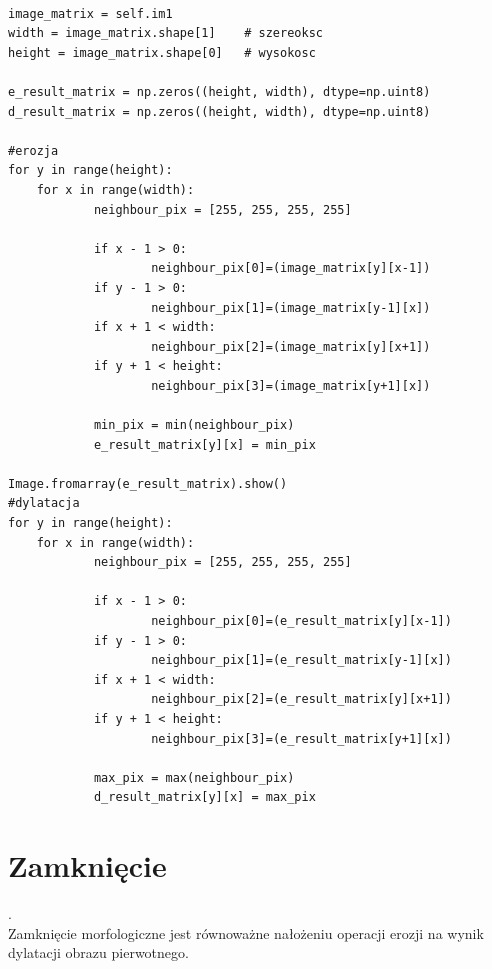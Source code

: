 \documentclass[final,a4paper,openany,12pt]{mwbk}
\begin{document}
\begin{lstlisting}[caption= Operacja otwarcia na obrazie szarym]

image_matrix = self.im1
width = image_matrix.shape[1]    # szereoksc
height = image_matrix.shape[0]   # wysokosc

e_result_matrix = np.zeros((height, width), dtype=np.uint8)
d_result_matrix = np.zeros((height, width), dtype=np.uint8)

#erozja
for y in range(height):
    for x in range(width):  
            neighbour_pix = [255, 255, 255, 255]

            if x - 1 > 0:
                    neighbour_pix[0]=(image_matrix[y][x-1])
            if y - 1 > 0:
                    neighbour_pix[1]=(image_matrix[y-1][x])
            if x + 1 < width:
                    neighbour_pix[2]=(image_matrix[y][x+1])
            if y + 1 < height:
                    neighbour_pix[3]=(image_matrix[y+1][x])

            min_pix = min(neighbour_pix)
            e_result_matrix[y][x] = min_pix

Image.fromarray(e_result_matrix).show()
#dylatacja
for y in range(height):
    for x in range(width):  
            neighbour_pix = [255, 255, 255, 255]

            if x - 1 > 0:
                    neighbour_pix[0]=(e_result_matrix[y][x-1])
            if y - 1 > 0:
                    neighbour_pix[1]=(e_result_matrix[y-1][x])
            if x + 1 < width:
                    neighbour_pix[2]=(e_result_matrix[y][x+1])
            if y + 1 < height:
                    neighbour_pix[3]=(e_result_matrix[y+1][x])

            max_pix = max(neighbour_pix)
            d_result_matrix[y][x] = max_pix    

\end{lstlisting}

\section{ Zamknięcie}
.\hfill\\
\indent
	Zamknięcie morfologiczne jest równoważne nałożeniu operacji erozji na wynik dylatacji obrazu pierwotnego.
\end{document}

